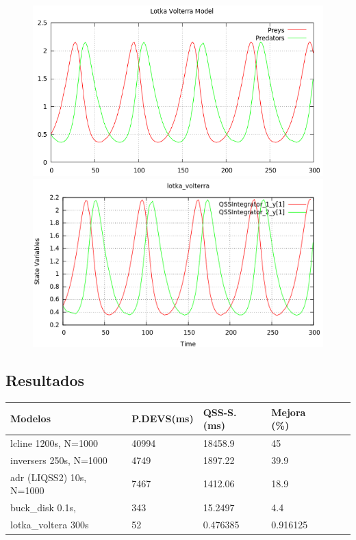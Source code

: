 \documentclass[a4paper,	11pt]{report}
\begin{document}
\begin{figure}[H]
\centering
\begin{minipage}{0.5\textwidth}
\centering
 \includegraphics[width=\linewidth]{lotka_voltera-pd}
\end{minipage}\hfill
\begin{minipage}{0.5\textwidth}
\centering
 \includegraphics[width=\linewidth]{lotka_voltera-qss}
\end{minipage}
\end{figure}

\subsection{Resultados}
\begin{table}[H]
\centering	
\label{my-label}
\begin{tabular}{llllll}
\toprule
{\bf Modelos}            &  {\bf P.DEVS(ms)} & {\bf QSS-S. (ms)} & {\bf Mejora (\%)} \\
\toprule
lcline 1200s, N=1000     & 40994         & 18458.9         & 45          \\
inversers 250s, N=1000   & 4749          & 1897.22         & 39.9        \\
adr (LIQSS2) 10s, N=1000 & 7467          & 1412.06         & 18.9        \\
buck\_disk  0.1s,        & 343           & 15.2497         & 4.4         \\
lotka\_voltera 300s      & 52            & 0.476385        & 0.916125
\end{tabular}
\end{table}

\nocite{*}



\end{document}
